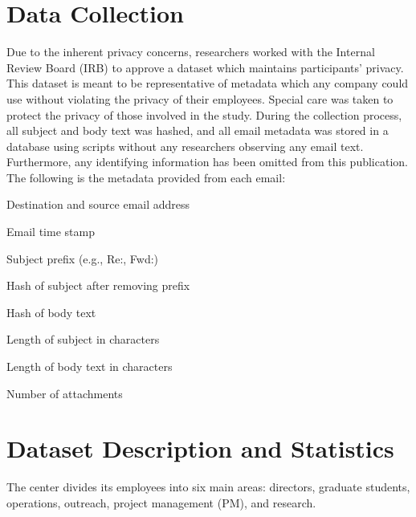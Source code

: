 \documentclass[12pt]{report}
\begin{document}
\section{Data Collection}
Due to the inherent privacy concerns, researchers worked with the Internal Review Board (IRB) to approve a dataset which maintains participants' privacy.
This dataset is meant to be representative of metadata which any company could use without violating the privacy of their employees.
Special care was taken to protect the privacy of those involved in the study.
During the collection process, all subject and body text was hashed, and all email metadata was stored in a database using scripts without any researchers observing any email text.
Furthermore, any identifying information has been omitted from this publication.
The following is the metadata provided from each email:
\begin{compactitem}
\item Destination and source email address
\item Email time stamp
\item Subject prefix (e.g., Re:, Fwd:)
\item Hash of subject after removing prefix
\item Hash of body text
\item Length of subject in characters
\item Length of body text in characters
\item Number of attachments
\end{compactitem}

\begin{table}[t]
\centering
\caption{A comparison between the internal dataset and the Enron email corpus.}
\label{tab:db_stats}
\end{table}

\section{Dataset Description and Statistics}
The center divides its employees into six main areas: directors, graduate students, operations, outreach, project management (PM), and research.
\end{document}

